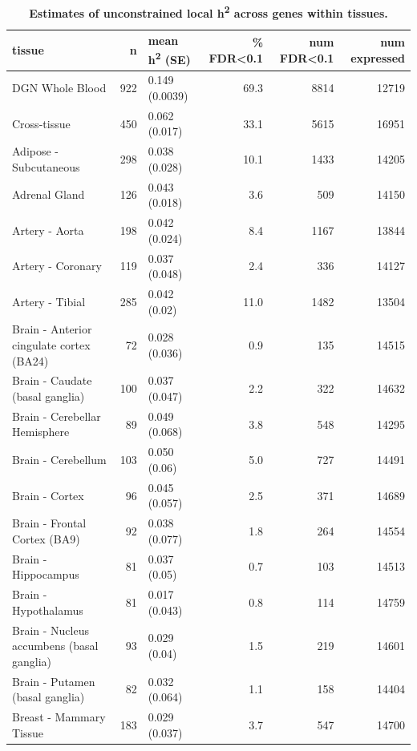 \documentclass[10pt,letterpaper]{article}
\begin{document}
\begin{table}[!ht]
\begin{adjustwidth}{-2.25in}{0in} %
\caption{
{\bf Estimates of unconstrained local h\textsuperscript{2} across genes within tissues.}}
\begin{tabular}{lrlrrr}
 \hline
tissue & n & mean h\textsuperscript{2} (SE) & \% FDR\textless{}0.1 & num FDR\textless{}0.1 & num expressed \\ 
  \hline
DGN Whole Blood & 922 & 0.149 (0.0039) & 69.3 & 8814 & 12719 \\ 
  Cross-tissue & 450 & 0.062 (0.017) & 33.1 & 5615 & 16951 \\ 
  Adipose - Subcutaneous & 298 & 0.038 (0.028) & 10.1 & 1433 & 14205 \\ 
  Adrenal Gland & 126 & 0.043 (0.018) & 3.6 & 509 & 14150 \\ 
  Artery - Aorta & 198 & 0.042 (0.024) & 8.4 & 1167 & 13844 \\ 
  Artery - Coronary & 119 & 0.037 (0.048) & 2.4 & 336 & 14127 \\ 
  Artery - Tibial & 285 & 0.042 (0.02) & 11.0 & 1482 & 13504 \\ 
  Brain - Anterior cingulate cortex (BA24) & 72 & 0.028 (0.036) & 0.9 & 135 & 14515 \\ 
  Brain - Caudate (basal ganglia) & 100 & 0.037 (0.047) & 2.2 & 322 & 14632 \\ 
  Brain - Cerebellar Hemisphere & 89 & 0.049 (0.068) & 3.8 & 548 & 14295 \\ 
  Brain - Cerebellum & 103 & 0.050 (0.06) & 5.0 & 727 & 14491 \\ 
  Brain - Cortex & 96 & 0.045 (0.057) & 2.5 & 371 & 14689 \\ 
  Brain - Frontal Cortex (BA9) & 92 & 0.038 (0.077) & 1.8 & 264 & 14554 \\ 
  Brain - Hippocampus & 81 & 0.037 (0.05) & 0.7 & 103 & 14513 \\ 
  Brain - Hypothalamus & 81 & 0.017 (0.043) & 0.8 & 114 & 14759 \\ 
  Brain - Nucleus accumbens (basal ganglia) & 93 & 0.029 (0.04) & 1.5 & 219 & 14601 \\ 
  Brain - Putamen (basal ganglia) & 82 & 0.032 (0.064) & 1.1 & 158 & 14404 \\ 
  Breast - Mammary Tissue & 183 & 0.029 (0.037) & 3.7 & 547 & 14700 \\ 

\end{tabular}
\end{adjustwidth}
\end{table}
\end{document}
